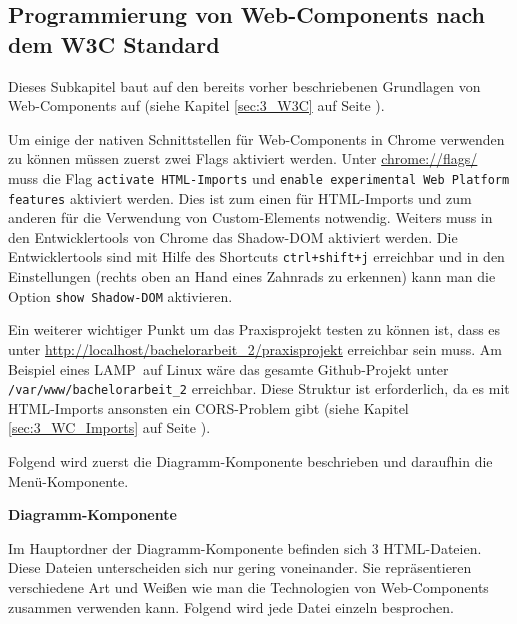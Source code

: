 \subsection{Programmierung von Web-Components nach dem W3C Standard}
\label{sec:4_WC_Pur}

Dieses Subkapitel baut auf den bereits vorher beschriebenen Grundlagen von Web-Components auf (siehe Kapitel \ref{sec:3_W3C} auf Seite \pageref{sec:3_W3C}).

Um einige der nativen Schnittstellen für Web-Components in Chrome verwenden zu können müssen zuerst zwei Flags aktiviert werden. Unter \url{chrome://flags/} muss die Flag \lstinline|activate HTML-Imports| und \lstinline|enable experimental Web Platform features| aktiviert werden. Dies ist zum einen für HTML-Imports und zum anderen für die Verwendung von Custom-Elements notwendig. Weiters muss in den Entwicklertools von Chrome das Shadow-DOM aktiviert werden. Die Entwicklertools sind mit Hilfe des Shortcuts \lstinline|ctrl+shift+j| erreichbar und in den Einstellungen (rechts oben an Hand eines Zahnrads zu erkennen) kann man die Option \lstinline|show Shadow-DOM| aktivieren.

Ein weiterer wichtiger Punkt um das Praxisprojekt testen zu können ist, dass es unter \url{http://localhost/bachelorarbeit_2/praxisprojekt} erreichbar sein muss. Am Beispiel eines \glqq LAMP\grqq\ auf Linux wäre das gesamte Github-Projekt unter \lstinline|/var/www/bachelorarbeit_2| erreichbar. Diese Struktur ist erforderlich, da es mit HTML-Imports ansonsten ein CORS-Problem gibt (siehe Kapitel \ref{sec:3_WC_Imports} auf Seite \pageref{sec:3_WC_Imports}).

Folgend wird zuerst die Diagramm-Komponente beschrieben und daraufhin die Menü-Komponente.

\textbf{Diagramm-Komponente}

Im Hauptordner der Diagramm-Komponente befinden sich 3 HTML-Dateien. Diese Dateien unterscheiden sich nur gering voneinander. Sie repräsentieren verschiedene Art und Weißen wie man die Technologien von Web-Components zusammen verwenden kann. Folgend wird jede Datei einzeln besprochen.

